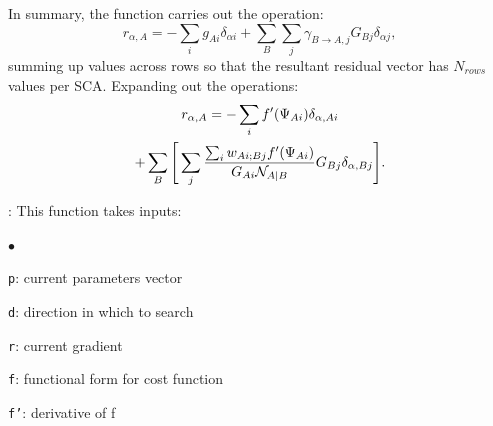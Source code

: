 \documentclass[]{pasj01}
\newcommand{\Katherine}[1]{{\textcolor{ForestGreen}{\bfseries{[#1]}}}}
\newcommand{\Chris}[1]{{\textcolor{red}{\bfseries{[#1]}}}}
\begin{document}
\noindent{}In summary, the function carries out the operation:
\begin{equation}
    r_{\alpha, A} = - \sum_i g_{Ai} \delta_{\alpha i} 
     + \sum_{B}\sum_j \gamma_{B \to A,j} G_{Bj} \delta_{\alpha j},
\end{equation}
summing up values across rows so that the resultant residual vector has $N_{rows}$ values per SCA. 
\vskip 0.05in
Expanding out the operations:
\begin{multline}
    r_{\alpha,A} = - \sum_i f'(\Psi_{Ai}) \delta_{\alpha, Ai} \\
     + \sum_{B} \Bigg[\sum_{j} \frac{ \sum_i w_{Ai;Bj} f'(\Psi_{Ai})}{G_{Ai}{\cal N}_{A|B}} G_{Bj} \delta_{\alpha, Bj}\Bigg].
\end{multline}





\vskip 0.1in

:
This function takes inputs: 
\begin{list}{$\bullet$}{}
\item {\tt p}: current parameters vector
\item {\tt d}: direction in which to search
\item {\tt r}: current gradient
\item {\tt f}: functional form for cost function
\item{\tt f'}: derivative of f
\end{list}
\end{document}
